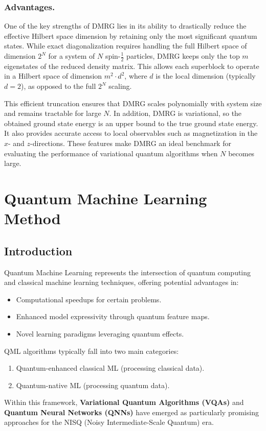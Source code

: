 \documentclass[pre,twocolumn,floatfix]{revtex4-1}
\begin{document}
\subsubsection{Advantages.}
One of the key strengths of DMRG lies in its ability to drastically reduce the effective Hilbert space dimension by retaining only the most significant quantum states. While exact diagonalization requires handling the full Hilbert space of dimension $2^N$ for a system of $N$ spin-$\tfrac{1}{2}$ particles, DMRG keeps only the top $m$ eigenstates of the reduced density matrix. This allows each superblock to operate in a Hilbert space of dimension $m^2 \cdot d^2$, where $d$ is the local dimension (typically $d=2$), as opposed to the full $2^N$ scaling.

This efficient truncation ensures that DMRG scales polynomially with system size and remains tractable for large $N$. In addition, DMRG is variational, so the obtained ground state energy is an upper bound to the true ground state energy. It also provides accurate access to local observables such as magnetization in the $x$- and $z$-directions. These features make DMRG an ideal benchmark for evaluating the performance of variational quantum algorithms when $N$ becomes large.

\section{Quantum Machine Learning Method\cite{qiskit-ml-tutorials}} 
\subsection{Introduction}
Quantum Machine Learning represents the intersection of quantum computing and classical machine learning techniques, offering potential advantages in:
\begin{itemize}
    \item Computational speedups for certain problems.
    \item Enhanced model expressivity through quantum feature maps.
    \item Novel learning paradigms leveraging quantum effects.
\end{itemize}

QML algorithms typically fall into two main categories:
\begin{enumerate}
    \item Quantum-enhanced classical ML (processing classical data).
    \item Quantum-native ML (processing quantum data).
\end{enumerate}
Within this framework, \textbf{Variational Quantum Algorithms (VQAs)} and \textbf{Quantum Neural Networks (QNNs)} have emerged as particularly promising approaches for the NISQ (Noisy Intermediate-Scale Quantum) era.
\end{document}
